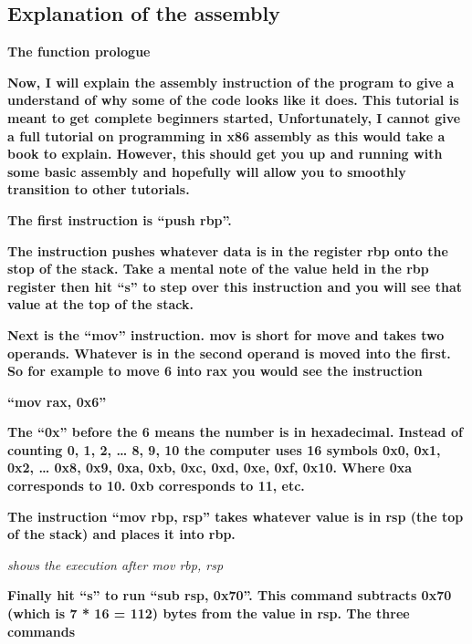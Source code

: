 \documentclass[letterpaper]{article}
\newcommand{\sitfig}[3]{
\begin{figure}[H]
\centering
\makebox[\textwidth][c]{
#2
}
\label{#1}
\end{figure}
}
\newcommand{\sitgfx}[4][scale=1.0]{
\sitfig{#3}{\texttt{[image: \#2]}}{#4}
}
\begin{document}
\subsection{Explanation of the assembly}

\textbf{The function prologue}

\textbf{Now, I will explain the assembly instruction of the program to give a understand of why some of the code looks
like it does. This tutorial is meant to get complete beginners started, Unfortunately, I cannot give a full tutorial on
programming in x86 assembly as this would take a book to explain. However, this should get you up and running with some
basic assembly and hopefully will allow you to smoothly transition to other tutorials.}

\textbf{The first instruction is ``push rbp''.}

  
\sitgfx[width=5.8335in,height=0.7035in]{reversing-img086.png}{fig:unk}{TODO CAPTION}
 

\textbf{The instruction pushes whatever data is in the register rbp onto the stop of the stack. Take a mental note of
the value held in the rbp register then hit ``s'' to step over this instruction and you will see that value at the top
of the stack.}

  
\sitgfx[width=5.8335in,height=3.6457in]{reversing-img087.png}{fig:unk}{TODO CAPTION}
 

\textbf{Next is the ``mov'' instruction. mov is short for move and takes two operands. Whatever is in the second operand
is moved into the first. So for example to move 6 into rax you would see the instruction}

\textbf{{}``mov rax, 0x6''}

\textbf{The ``0x'' before the 6 means the number is in hexadecimal. Instead of counting 0, 1, 2, {\dots} 8, 9, 10 the
computer uses 16 symbols 0x0, 0x1, 0x2, {\dots} 0x8, 0x9, 0xa, 0xb, 0xc, 0xd, 0xe, 0xf, 0x10. Where 0xa corresponds to
10. 0xb corresponds to 11, etc.}

\textbf{The instruction ``mov rbp, rsp'' takes whatever value is in rsp (the top of the stack) and places it into rbp.}

  
\sitgfx[width=5.8335in,height=3.6457in]{reversing-img088.png}{fig:unk}{TODO CAPTION}
 

\textit{shows the execution after mov rbp, rsp}

\textbf{Finally hit ``s'' to run ``sub rsp, 0x70''. This command subtracts 0x70 (which is 7 * 16 = 112) bytes from the
value in rsp. The three commands}
\end{document}
